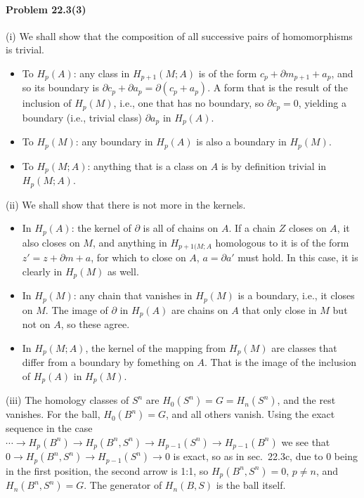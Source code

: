 \documentclass[a4paper,12pt]{article}
\newcommand{\problem}[1]{\paragraph{Problem #1}}
\begin{document}
\problem{22.3(3)} (i) We shall show that the composition of all successive pairs of homomorphisms is trivial.
\begin{itemize}
 \item To $H_p(A)$: any class in $H_{p+1}(M; A)$ is of the form $c_p+\partial m_{p+1} + a_p$, and so its boundary is $\partial c_p + \partial a_p = \partial (c_p + a_p)$. A form that is the result of the inclusion of $H_{p}(M)$, i.e., one that has no boundary, so $\partial c_p =0$, yielding a boundary (i.e., trivial class) $\partial a_p$ in $H_p(A)$.

 \item To $H_p(M)$: any boundary in $H_p(A)$ is also a boundary in $H_p(M)$.

 \item To $H_p(M; A)$: anything that is a class on $A$ is by definition trivial in $H_p(M; A)$.
\end{itemize}

(ii) We shall show that there is not more in the kernels.
\begin{itemize}
 \item In $H_p(A)$: the kernel of $\partial$ is all of chains on $A$. If a chain $Z$ closes on $A$, it also closes on $M$, and anything in $H_{p+1(M; A}$ homologous to it is of the form $z'=z + \partial m + a$, for which to close on $A$, $a=\partial a'$ must hold. In this case, it is clearly in $H_p(M)$ as well.

 \item In $H_p(M)$: any chain that vanishes in $H_p(M)$ is a boundary, i.e., it closes on $M$. The image of $\partial$ in $H_p(A)$ are chains on $A$ that only close in $M$ but not on $A$, so these agree.

 \item In $H_p(M; A)$, the kernel of the mapping from $H_p(M)$ are classes that differ from a boundary by fomething on $A$. That is the image of the inclusion of $H_p(A)$ in $H_p(M)$.
\end{itemize}


(iii) The homology classes of $S^n$ are $H_0(S^n)=G=H_n(S^n)$, and the rest vanishes. For the ball, $H_0(B^n) = G$, and all others vanish. Using the exact sequence in the case $\cdots \to H_p(B^n) \to H_p(B^n, S^n) \to H_{p-1}(S^n) \to H_{p-1}(B^n)$ we see that $0 \to H_p(B^n, S^n) \to H_{p-1}(S^n)\to 0$ is exact, so as in sec.\ 22.3c, due to 0 being in the first position, the second arrow is 1:1, so $H_p(B^n, S^n)=0$, $p\ne n$, and $H_n(B^n, S^n) = G$. The generator of $H_n(B, S)$ is the ball itself.
\end{document}
